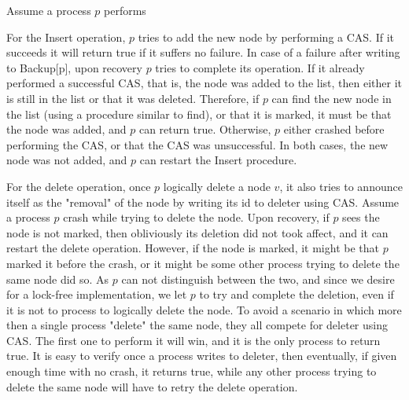 Assume a process $p$ performs 

For the Insert operation, $p$ tries to add the new node by performing a CAS. If it succeeds it will return true if it suffers no failure. In case of a failure after writing to Backup[p], upon recovery $p$ tries to complete its operation. If it already performed a successful CAS, that is, the node was added to the list, then either it is still in the list or that it was deleted. Therefore, if $p$ can find the new node in the list (using a procedure similar to find), or that it is marked, it must be that the node was added, and $p$ can return true. Otherwise, $p$ either crashed before performing the CAS, or that the CAS was unsuccessful. In both cases, the new node was not added, and $p$ can restart the Insert procedure.

For the delete operation, once $p$ logically delete a node $v$, it also tries to announce itself as the "removal" of the node by writing its id to deleter using CAS. Assume a process $p$ crash while trying to delete the node. Upon recovery, if $p$ sees the node is not marked, then obliviously its deletion did not took affect, and it can restart the delete operation. However, if the node is marked, it might be that $p$ marked it before the crash, or it might be some other process trying to delete the same node did so. As $p$ can not distinguish between the two, and since we desire for a lock-free implementation, we let $p$ to try and complete the deletion, even if it is not to process to logically delete the node. To avoid a scenario in which more then a single process "delete" the same node, they all compete for deleter using CAS. The first one to perform it will win, and it is the only process to return true. It is easy to verify once a process writes to deleter, then eventually, if given enough time with no crash, it returns true, while any other process trying to delete the same node will have to retry the delete operation.




 